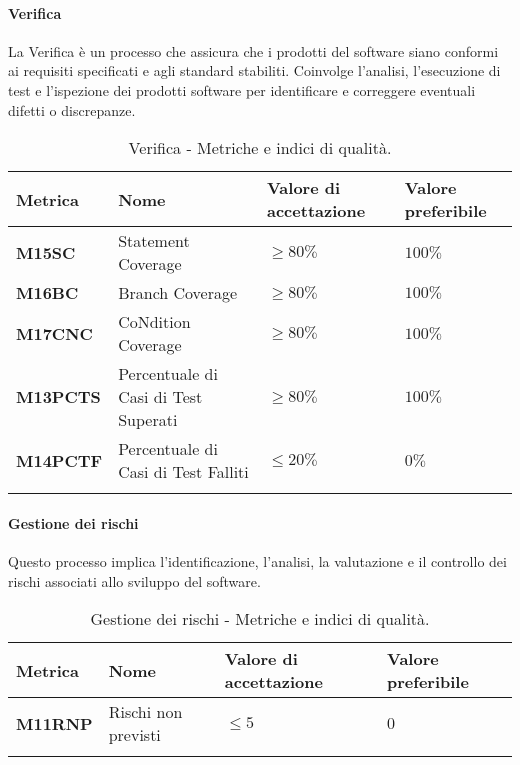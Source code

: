 \paragraph{Verifica}
La Verifica è un processo che assicura che i prodotti del software siano conformi ai requisiti specificati e agli standard stabiliti. Coinvolge l'analisi, l'esecuzione di test e l'ispezione dei prodotti software per identificare e correggere eventuali difetti o discrepanze.
\hspace{1pt}
\begin{longtable}{|C{1.5cm}|L{3cm}|L{2.5cm}|L{2.5cm}|}
    \hline
    \textbf{Metrica} & \textbf{Nome} & \textbf{Valore di accettazione} & \textbf{Valore preferibile} \\
    \hline
    \textbf{M15SC} & Statement Coverage & $\geq 80\%$ & $100\%$ \\
    \hline
    \textbf{M16BC} & Branch Coverage & $\geq 80\%$ & $100\%$ \\
    \hline
    \textbf{M17CNC} & CoNdition Coverage & $\geq 80\%$ & $100\%$ \\
    \hline
    \textbf{M13PCTS} & Percentuale di Casi di Test Superati & $\geq 80\%$ & $100\%$ \\
    \hline
    \textbf{M14PCTF} & Percentuale di Casi di Test Falliti & $\leq 20\%$ & $0\%$ \\
    \hline
\caption{Verifica - Metriche e indici di qualità.}
\label{tab:metriche_testo}
\end{longtable}


\paragraph{Gestione dei rischi}
Questo processo implica l'identificazione, l'analisi, la valutazione e il controllo dei rischi associati allo sviluppo del software. 
\hspace{1pt}
    \begin{longtable}{|C{1.5cm}|L{3cm}|L{2.5cm}|L{2.5cm}|}
        \hline
      \textbf{Metrica} & \textbf{Nome} & \textbf{Valore di accettazione} & \textbf{Valore preferibile} \\
      \hline
      \textbf{M11RNP}    & Rischi non previsti  & $\leq 5$ &   $0$ \\
      \hline
    \caption{Gestione dei rischi - Metriche e indici di qualità.}
    \label{tab:tabella2}
\end{longtable}


